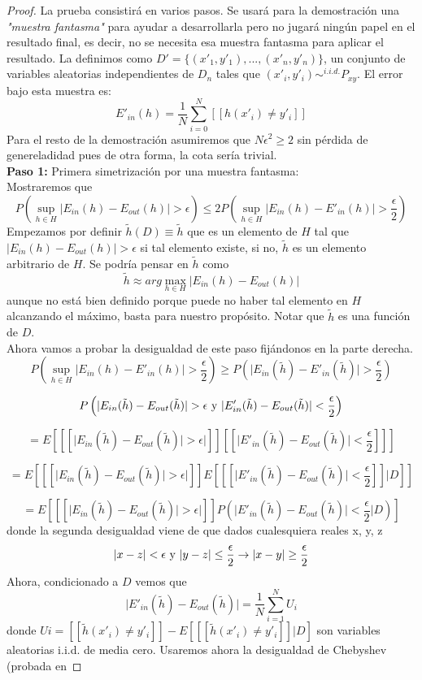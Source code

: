 \begin{proof}
La prueba consistirá en varios pasos. Se usará para la demostración una \textit{"muestra fantasma"} para ayudar a desarrollarla pero no jugará ningún papel en el resultado final, es decir, no se necesita esa muestra fantasma para aplicar el resultado. La definimos como $D'=\lbrace(x'_{1},y'_{1}),...,(x'_{n},y'_{n})\rbrace$, un conjunto de variables aleatorias independientes de $D_{n}$ tales que $(x'_{i},y'_{i})\sim^{i.i.d.} P_{xy}$. El error bajo esta muestra es:
\[ E'_{in}(h)=\frac{1}{N}\sum_{i=0}^{N}[[h(x'_{i}) \neq y'_{i}]] \] 
Para el resto de la demostración asumiremos que $N\epsilon^{2} \geq 2$ sin pérdida de genereladidad pues de otra forma, la cota sería trivial.\\
\textbf{Paso 1:} Primera simetrización por una muestra fantasma:\\
Mostraremos que 
\[ P \left( \sup_{h \in H} \vert E_{in}(h)-E_{out}(h) \vert >\epsilon \right) \leq 2P \left( \sup_{h \in H} \vert E_{in}(h)-E'_{in}(h) \vert >\frac{\epsilon}{2} \right) \]
Empezamos por definir $\tilde{h}(D) \equiv \tilde{h}$ que es un elemento de $H$ tal que $\vert E_{in}(h)-E_{out}(h) \vert > \epsilon$ si tal elemento existe, si no, $\tilde{h}$ es un elemento arbitrario de $H$. Se podría pensar en $\tilde{h}$ como 
\[ \tilde{h} \approx arg \max_{h \in H} \vert E_{in}(h)-E_{out}(h) \vert \]
aunque no está bien definido porque puede no haber tal elemento en $H$ alcanzando el máximo, basta para nuestro propósito. Notar que $\tilde{h}$ es una función de $D$.\\
Ahora vamos a probar la desigualdad de este paso fijándonos en la parte derecha.
\[ P \left( \sup_{h \in H} \vert E_{in}(h)-E'_{in}(h) \vert >\frac{\epsilon}{2} \right) \geq P \left( \vert E_{in}(\tilde{h})-E'_{in}(\tilde{h}) \vert >\frac{\epsilon}{2} \right) \]

\[ P \left( \vert E_{in}(\tilde{h})-E_{out}(\tilde{h}) \vert > \epsilon \textnormal{ y }\vert E'_{in}(\tilde{h})-E_{out}(\tilde{h}) \vert < \frac{\epsilon}{2} \right) \]

\[ = E \left[ [[\vert E_{in}(\tilde{h})-E_{out}(\tilde{h}) \vert > \epsilon \vert]] [[ \vert E'_{in}(\tilde{h})-E_{out}(\tilde{h}) \vert < \frac{\epsilon}{2} ]] \right] \]

\[ = E \left[ [[\vert E_{in}(\tilde{h})-E_{out}(\tilde{h}) \vert > \epsilon \vert]] E \left[ [[ \vert E'_{in}(\tilde{h})-E_{out}(\tilde{h}) \vert < \frac{\epsilon}{2} ]] \bigg\vert D \right] \right] \]

\[ = E \left[ [[\vert E_{in}(\tilde{h})-E_{out}(\tilde{h}) \vert > \epsilon \vert]] P \left( \vert E'_{in}(\tilde{h})-E_{out}(\tilde{h}) \vert < \frac{\epsilon}{2}  \bigg\vert D \right) \right] \]
donde la segunda desigualdad viene de que dados cualesquiera reales x, y, z
\[ \vert x-z\vert < \epsilon \textnormal{ y } \vert y-z\vert \leq \frac{\epsilon}{2} \rightarrow \vert x-y\vert \geq \frac{\epsilon}{2} \]
Ahora, condicionado a $D$ vemos que
\[ \vert E'_{in}(\tilde{h})-E_{out}(\tilde{h}) \vert = \frac{1}{N}\sum_{i=1}^{N}U_{i} \]
donde $U{i}=[[ \tilde{h}(x'_{i}) \neq y'_{i} ]]-E\left[ [[ \tilde{h}(x'_{i}) \neq y'_{i} ]] \vert D \right]$ son variables aleatorias i.i.d. de media cero. Usaremos ahora la desigualdad de Chebyshev (probada en 
\end{proof}
\cite{VCboundRNowak}
